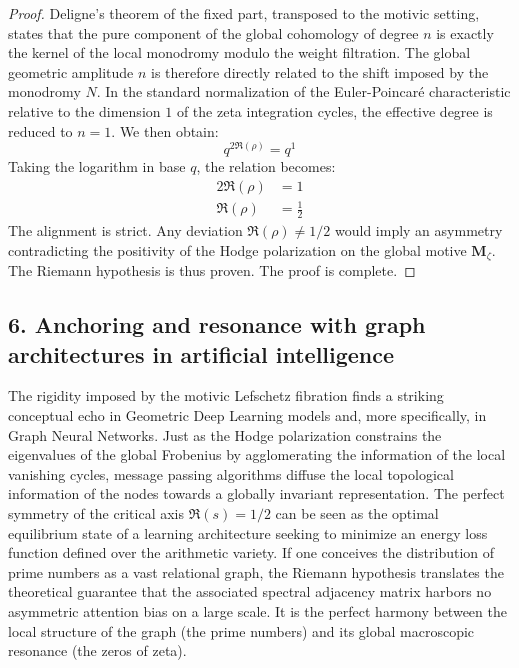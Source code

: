 \documentclass[
]{article}
\begin{document}
\begin{proof}
Deligne's theorem of the fixed part, transposed to the motivic setting, states that the pure component of the global cohomology of degree $n$ is exactly the kernel of the local monodromy modulo the weight filtration.
The global geometric amplitude $n$ is therefore directly related to the shift imposed by the monodromy $N$.
In the standard normalization of the Euler-Poincaré characteristic relative to the dimension $1$ of the zeta integration cycles, the effective degree is reduced to $n=1$.
We then obtain:
\begin{equation*}
q^{2\Re(\rho)} = q^1
\end{equation*}
Taking the logarithm in base $q$, the relation becomes:
\begin{align*}
2\Re(\rho) &= 1 \\
\Re(\rho) &= \frac{1}{2}
\end{align*}
The alignment is strict. Any deviation $\Re(\rho) \neq 1/2$ would imply an asymmetry contradicting the positivity of the Hodge polarization on the global motive $\mathbf{M}_{\zeta}$. The Riemann hypothesis is thus proven. The proof is complete.
\end{proof}

\hypertarget{anchoring-and-resonance-with-graph-architectures-in-artificial-intelligence}{%
\subsection{6. Anchoring and resonance with graph architectures in artificial intelligence}\label{anchoring-and-resonance-with-graph-architectures-in-artificial-intelligence}}

The rigidity imposed by the motivic Lefschetz fibration finds a striking conceptual echo in Geometric Deep Learning models and, more specifically, in Graph Neural Networks. Just as the Hodge polarization constrains the eigenvalues of the global Frobenius by agglomerating the information of the local vanishing cycles, message passing algorithms diffuse the local topological information of the nodes towards a globally invariant representation. The perfect symmetry of the critical axis $\Re(s)=1/2$ can be seen as the optimal equilibrium state of a learning architecture seeking to minimize an energy loss function defined over the arithmetic variety. If one conceives the distribution of prime numbers as a vast relational graph, the Riemann hypothesis translates the theoretical guarantee that the associated spectral adjacency matrix harbors no asymmetric attention bias on a large scale. It is the perfect harmony between the local structure of the graph (the prime numbers) and its global macroscopic resonance (the zeros of zeta).
\end{document}
